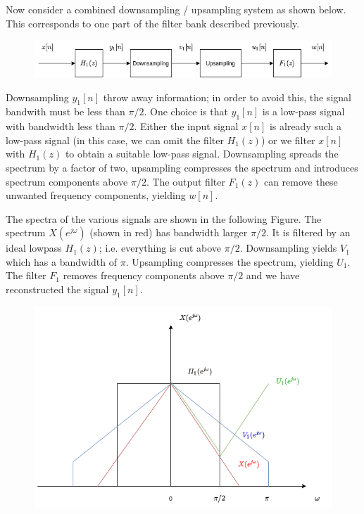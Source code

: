 Now consider a combined downsampling / upsampling system as shown below. This corresponds to one part of the filter bank described previously.

\begin{figure}[H]
    \centering
    \includegraphics[scale=0.5]{images/2021-11-09-subband_07.png}
\end{figure}

Downsampling $y_1[n]$ throw away information; in order to avoid this, the signal bandwith must be less than $\pi/2$. One choice is that  $y_1[n]$ is a low-pass signal with bandwidth less than $\pi/2$. Either the input signal $x[n]$ is already such a low-pass signal (in this case, we can omit the filter $H_1(z)$) or we filter $x[n]$ with $H_1(z)$ to obtain a suitable low-pass signal. Downsampling spreads the spectrum by a factor of two, upsampling compresses the spectrum and introduces spectrum components above $\pi/2$. The output filter $F_1(z)$ can remove these unwanted frequency components, yielding $w[n]$.

The spectra of the various signals are shown in the following Figure. The spectrum $X(e^{j\omega})$ (shown in red) has bandwidth larger $\pi/2$. It is filtered by an ideal lowpass $H_1(z)$; i.e. everything is cut above $\pi/2$. Downsampling yields $V_1$ which has a bandwidth of $\pi$. Upsampling compresses the spectrum, yielding $U_1$. The filter $F_1$ removes frequency components above $\pi/2$ and we have reconstructed the signal $y_1[n]$.

\begin{figure}[H]
    \centering
    \includegraphics[scale=0.5]{images/2021-11-09-subband_08.png}
\end{figure}

